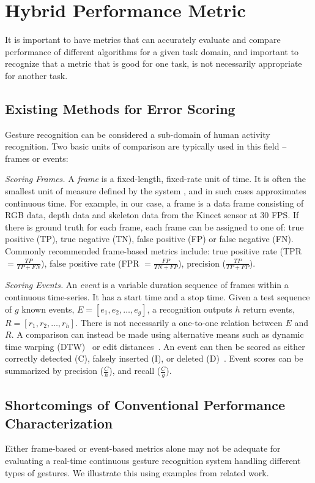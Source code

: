 \chapter{Hybrid Performance Metric}
It is important to have metrics that can accurately evaluate and compare
performance of different algorithms for a given task domain, and important 
to recognize that a metric that is good for one task, is not
necessarily appropriate for another task. 

\section{Existing Methods for Error Scoring}
Gesture recognition can be considered a sub-domain of human activity
recognition. Two basic units of comparison are typically used in this field
-- frames or events:

\textit{Scoring Frames.} A \textit{frame} is a fixed-length,
fixed-rate unit of time. It is often the smallest unit of measure defined by the system \cite{ward11}, and in such cases approximates continuous time.
For example, in our case, a frame is a data frame consisting of RGB data, depth
data and skeleton data from the Kinect sensor at 30 FPS. If there is ground
truth for each frame, each frame can be assigned to one of: true positive
(TP), true negative (TN), false positive (FP) or false negative (FN). Commonly
recommended frame-based metrics include: true positive rate (TPR $= \frac{TP}{TP
+ FN}$), false positive rate (FPR $= \frac{FP}{TN + FP}$), precision
($\frac{TP}{TP + FP}$).

\textit{Scoring Events.} An \textit{event} is a variable duration sequence of
frames within a continuous time-series.  It has a start time and a stop time.
Given a test sequence of $g$ known events, $E = [e_1, e_2, \ldots, e_g]$, a
recognition outputs $h$ return events, $R = [r_1, r_2, \ldots, r_h]$. There is
not necessarily a one-to-one relation between $E$ and $R$. A comparison can
instead be made using alternative means such as dynamic time warping
(DTW)~\cite{berndt94} or edit distances~\cite{guyon13}. An event can then be
scored as either correctly detected (C), falsely inserted (I), or deleted
(D)~\cite{ward11}. Event scores can be summarized
by precision ($\frac{C}{h}$), and recall
($\frac{C}{g}$).

\section{Shortcomings of Conventional Performance Characterization}
Either frame-based or event-based metrics 
alone may not be adequate for evaluating a real-time continuous gesture recognition system handling different types of gestures. We illustrate this using examples from related work.

